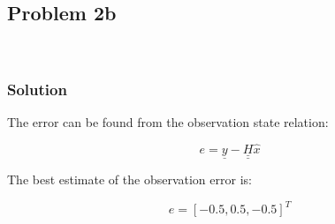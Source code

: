 \documentclass[conf]{new-aiaa}
\begin{document}
%
%	
%	
%	
%	



\subsection*{Problem 2b} 

\begin{center}
	 \\
\end{center}


\subsubsection*{Solution} 

The error can be found from the observation state relation: 

\begin{equation}
	e = \underline{y} - \underline{\underline{H}} \hat{x}
\end{equation}

The best estimate of the observation error is: 

\begin{equation}
	e = [-0.5, 0.5, -0.5]^T 
\end{equation}






\end{document}
